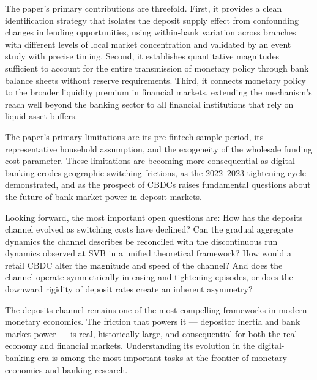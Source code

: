 \documentclass[12pt,a4paper]{article}
\begin{document}
The paper's primary contributions are threefold. First, it provides a clean
identification strategy that isolates the deposit supply effect from confounding
changes in lending opportunities, using within-bank variation across branches
with different levels of local market concentration and validated by an event
study with precise timing. Second, it establishes quantitative magnitudes
sufficient to account for the entire transmission of monetary policy through
bank balance sheets without reserve requirements. Third, it connects monetary
policy to the broader liquidity premium in financial markets, extending the
mechanism's reach well beyond the banking sector to all financial institutions
that rely on liquid asset buffers.

The paper's primary limitations are its pre-fintech sample period, its
representative household assumption, and the exogeneity of the wholesale
funding cost parameter. These limitations are becoming more consequential as
digital banking erodes geographic switching frictions, as the 2022--2023
tightening cycle demonstrated, and as the prospect of CBDCs raises fundamental
questions about the future of bank market power in deposit markets.

Looking forward, the most important open questions are: How has the deposits
channel evolved as switching costs have declined? Can the gradual aggregate
dynamics the channel describes be reconciled with the discontinuous run
dynamics observed at SVB in a unified theoretical framework? How would a
retail CBDC alter the magnitude and speed of the channel? And does the channel
operate symmetrically in easing and tightening episodes, or does the
downward rigidity of deposit rates create an inherent asymmetry?

The deposits channel remains one of the most compelling frameworks in modern
monetary economics. The friction that powers it --- depositor inertia and bank
market power --- is real, historically large, and consequential for both the
real economy and financial markets. Understanding its evolution in the
digital-banking era is among the most important tasks at the frontier of
monetary economics and banking research.
\end{document}
